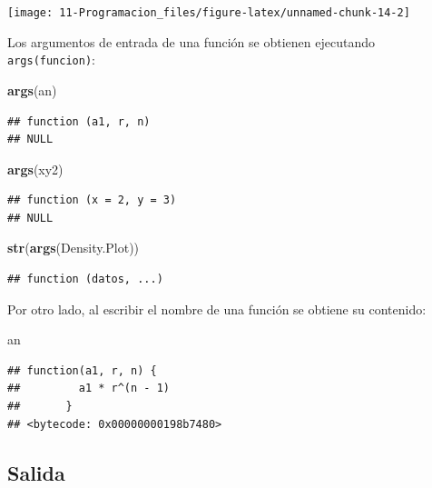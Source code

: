 \documentclass[]{book}
\newenvironment{Shaded}{\begin{snugshade}}{\end{snugshade}}
\newcommand{\KeywordTok}[1]{\textcolor[rgb]{0.13,0.29,0.53}{\textbf{#1}}}
\newcommand{\NormalTok}[1]{#1}
\begin{document}
\begin{center}\texttt{[image: 11-Programacion\_files/figure-latex/unnamed-chunk-14-2]} \end{center}

Los argumentos de entrada de una función se obtienen ejecutando
\texttt{args(funcion)}:

\begin{Shaded}
\begin{Highlighting}[]
\KeywordTok{args}\NormalTok{(an)}
\end{Highlighting}
\end{Shaded}

\begin{verbatim}
## function (a1, r, n) 
## NULL
\end{verbatim}

\begin{Shaded}
\begin{Highlighting}[]
\KeywordTok{args}\NormalTok{(xy2)}
\end{Highlighting}
\end{Shaded}

\begin{verbatim}
## function (x = 2, y = 3) 
## NULL
\end{verbatim}

\begin{Shaded}
\begin{Highlighting}[]
\KeywordTok{str}\NormalTok{(}\KeywordTok{args}\NormalTok{(Density.Plot))}
\end{Highlighting}
\end{Shaded}

\begin{verbatim}
## function (datos, ...)
\end{verbatim}

Por otro lado, al escribir el nombre de una función se obtiene su
contenido:

\begin{Shaded}
\begin{Highlighting}[]
\NormalTok{an}
\end{Highlighting}
\end{Shaded}

\begin{verbatim}
## function(a1, r, n) {
##         a1 * r^(n - 1)
##       }
## <bytecode: 0x00000000198b7480>
\end{verbatim}

\subsection{Salida}\label{salida}
\end{document}
